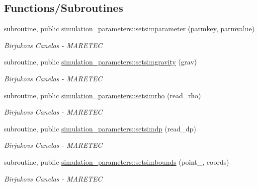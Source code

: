 \subsection*{Functions/\+Subroutines}
\begin{DoxyCompactItemize}
\item 
subroutine, public \mbox{\hyperlink{namespacesimulation__parameters_af905a4701f68f0ad0a50606101fda7d6}{simulation\+\_\+parameters\+::setsimparameter}} (parmkey, parmvalue)
\begin{DoxyCompactList}\small\item\em Birjukovs Canelas -\/ M\+A\+R\+E\+T\+EC \end{DoxyCompactList}\item 
subroutine, public \mbox{\hyperlink{namespacesimulation__parameters_a21b04e29ccee801263abc6e27fba026f}{simulation\+\_\+parameters\+::setsimgravity}} (grav)
\begin{DoxyCompactList}\small\item\em Birjukovs Canelas -\/ M\+A\+R\+E\+T\+EC \end{DoxyCompactList}\item 
subroutine, public \mbox{\hyperlink{namespacesimulation__parameters_a877176f5e4ba2c41a2514b824520f315}{simulation\+\_\+parameters\+::setsimrho}} (read\+\_\+rho)
\begin{DoxyCompactList}\small\item\em Birjukovs Canelas -\/ M\+A\+R\+E\+T\+EC \end{DoxyCompactList}\item 
subroutine, public \mbox{\hyperlink{namespacesimulation__parameters_a757c1773e1c21deb9f3bfd2dc258bd1a}{simulation\+\_\+parameters\+::setsimdp}} (read\+\_\+dp)
\begin{DoxyCompactList}\small\item\em Birjukovs Canelas -\/ M\+A\+R\+E\+T\+EC \end{DoxyCompactList}\item 
subroutine, public \mbox{\hyperlink{namespacesimulation__parameters_a71f285f54b412efac79d40c9ecd58037}{simulation\+\_\+parameters\+::setsimbounds}} (point\+\_\+, coords)
\begin{DoxyCompactList}\small\item\em Birjukovs Canelas -\/ M\+A\+R\+E\+T\+EC \end{DoxyCompactList}\end{DoxyCompactItemize}
